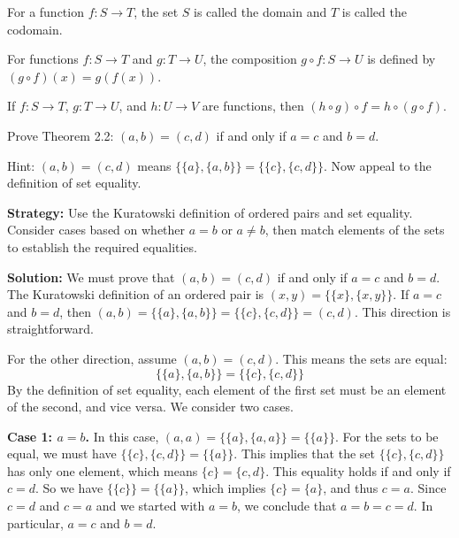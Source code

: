 \begin{definition}
For a function $f: S \to T$, the set $S$ is called the domain and $T$ is called the codomain.
\end{definition}

\begin{definition}
For functions $f: S \to T$ and $g: T \to U$, the composition $g \circ f: S \to U$ is defined by $(g \circ f)(x) = g(f(x))$.
\end{definition}

\begin{theorem}
If $f: S \to T$, $g: T \to U$, and $h: U \to V$ are functions, then $(h \circ g) \circ f = h \circ (g \circ f)$.
\end{theorem}



\begin{problembox}
Prove Theorem 2.2: $(a, b) = (c, d)$ if and only if $a=c$ and $b=d$.

Hint: $(a, b) = (c, d)$ means $\{\{a\}, \{a, b\}\} = \{\{c\}, \{c, d\}\}$. Now appeal to the definition of set equality.
\end{problembox}

\noindent\textbf{Strategy:} Use the Kuratowski definition of ordered pairs and set equality. Consider cases based on whether $a=b$ or $a\neq b$, then match elements of the sets to establish the required equalities.

\bigskip\noindent\textbf{Solution:}  
We must prove that $(a, b) = (c, d)$ if and only if $a=c$ and $b=d$.
The Kuratowski definition of an ordered pair is $(x, y) = \{\{x\}, \{x, y\}\}$.
If $a=c$ and $b=d$, then $(a,b) = \{\{a\}, \{a,b\}\} = \{\{c\}, \{c,d\}\} = (c,d)$. This direction is straightforward.

For the other direction, assume $(a, b) = (c, d)$. This means the sets are equal:
\[ \{\{a\}, \{a, b\}\} = \{\{c\}, \{c, d\}\} \]
By the definition of set equality, each element of the first set must be an element of the second, and vice versa. We consider two cases.

\textbf{Case 1: $a=b$.}
In this case, $(a, a) = \{\{a\}, \{a, a\}\} = \{\{a\}\}$.
For the sets to be equal, we must have $\{\{c\}, \{c, d\}\} = \{\{a\}\}$. This implies that the set $\{\{c\}, \{c, d\}\}$ has only one element, which means $\{c\} = \{c, d\}$. This equality holds if and only if $c=d$.
So we have $\{\{c\}\} = \{\{a\}\}$, which implies $\{c\} = \{a\}$, and thus $c=a$.
Since $c=d$ and $c=a$ and we started with $a=b$, we conclude that $a = b = c = d$. In particular, $a=c$ and $b=d$.

